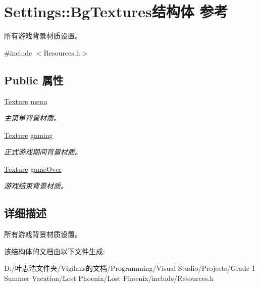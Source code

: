 \hypertarget{struct_settings_1_1_bg_textures}{}\section{Settings\+:\+:Bg\+Textures结构体 参考}
\label{struct_settings_1_1_bg_textures}


所有游戏背景材质设置。  




{\ttfamily \#include $<$Resources.\+h$>$}

\subsection*{Public 属性}
\begin{DoxyCompactItemize}
\item 
\mbox{\label{struct_settings_1_1_bg_textures_ab2f017635aaeb1ee5dbb544f2a053b30}} 
\hyperlink{struct_texture}{Texture} \hyperlink{struct_settings_1_1_bg_textures_ab2f017635aaeb1ee5dbb544f2a053b30}{menu}
\begin{DoxyCompactList}\small\item\em 主菜单背景材质。 \end{DoxyCompactList}\item 
\mbox{\label{struct_settings_1_1_bg_textures_a18b57a3e110a025b0b44ba3d838efc88}} 
\hyperlink{struct_texture}{Texture} \hyperlink{struct_settings_1_1_bg_textures_a18b57a3e110a025b0b44ba3d838efc88}{gaming}
\begin{DoxyCompactList}\small\item\em 正式游戏期间背景材质。 \end{DoxyCompactList}\item 
\mbox{\label{struct_settings_1_1_bg_textures_ab00469bb4e54982cfffe1b7f48f593f2}} 
\hyperlink{struct_texture}{Texture} \hyperlink{struct_settings_1_1_bg_textures_ab00469bb4e54982cfffe1b7f48f593f2}{game\+Over}
\begin{DoxyCompactList}\small\item\em 游戏结束背景材质。 \end{DoxyCompactList}\end{DoxyCompactItemize}


\subsection{详细描述}
所有游戏背景材质设置。 



该结构体的文档由以下文件生成\+:\begin{DoxyCompactItemize}
\item 
D\+:/叶志浩文件夹/\+Vigilans的文档/\+Programming/\+Visual Studio/\+Projects/\+Grade 1 Summer Vacation/\+Lost Phoenix/\+Lost Phoenix/include/Resources.\+h\end{DoxyCompactItemize}
